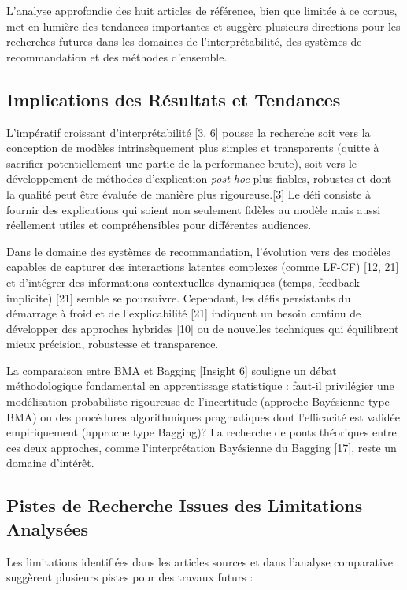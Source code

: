 \documentclass[11pt,a4paper]{article}
\begin{document}
L'analyse approfondie des huit articles de référence, bien que limitée à ce corpus, met en lumière des tendances importantes et suggère plusieurs directions pour les recherches futures dans les domaines de l'interprétabilité, des systèmes de recommandation et des méthodes d'ensemble.

\subsection{Implications des Résultats et Tendances}

L'impératif croissant d'interprétabilité [3, 6] pousse la recherche soit vers la conception de modèles intrinsèquement plus simples et transparents (quitte à sacrifier potentiellement une partie de la performance brute), soit vers le développement de méthodes d'explication \textit{post-hoc} plus fiables, robustes et dont la qualité peut être évaluée de manière plus rigoureuse.[3] Le défi consiste à fournir des explications qui soient non seulement fidèles au modèle mais aussi réellement utiles et compréhensibles pour différentes audiences.

Dans le domaine des systèmes de recommandation, l'évolution vers des modèles capables de capturer des interactions latentes complexes (comme LF-CF) [12, 21] et d'intégrer des informations contextuelles dynamiques (temps, feedback implicite) [21] semble se poursuivre. Cependant, les défis persistants du démarrage à froid et de l'explicabilité [21] indiquent un besoin continu de développer des approches hybrides [10] ou de nouvelles techniques qui équilibrent mieux précision, robustesse et transparence.

La comparaison entre BMA et Bagging [Insight 6] souligne un débat méthodologique fondamental en apprentissage statistique : faut-il privilégier une modélisation probabiliste rigoureuse de l'incertitude (approche Bayésienne type BMA) ou des procédures algorithmiques pragmatiques dont l'efficacité est validée empiriquement (approche type Bagging)? La recherche de ponts théoriques entre ces deux approches, comme l'interprétation Bayésienne du Bagging [17], reste un domaine d'intérêt.

\subsection{Pistes de Recherche Issues des Limitations Analysées}

Les limitations identifiées dans les articles sources et dans l'analyse comparative suggèrent plusieurs pistes pour des travaux futurs :
\end{document}

